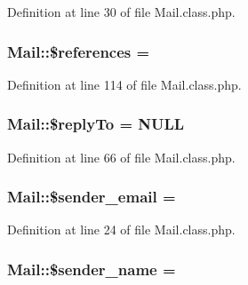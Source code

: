 Definition at line 30 of file Mail.\+class.\+php.

\subsubsection[{\texorpdfstring{\$references}{$references}}]{\setlength{\rightskip}{0pt plus 5cm}Mail\+::\$references = \textquotesingle{}\textquotesingle{}}\hypertarget{classMail_abcd438320caac44b166df90ba9092fe9}{}\label{classMail_abcd438320caac44b166df90ba9092fe9}


Definition at line 114 of file Mail.\+class.\+php.

\subsubsection[{\texorpdfstring{\$reply\+To}{$replyTo}}]{\setlength{\rightskip}{0pt plus 5cm}Mail\+::\$reply\+To = N\+U\+LL}\hypertarget{classMail_a55788852017ccc1716af69cdde26df99}{}\label{classMail_a55788852017ccc1716af69cdde26df99}


Definition at line 66 of file Mail.\+class.\+php.

\subsubsection[{\texorpdfstring{\$sender\+\_\+email}{$sender_email}}]{\setlength{\rightskip}{0pt plus 5cm}Mail\+::\$sender\+\_\+email = \textquotesingle{}\textquotesingle{}}\hypertarget{classMail_a94dccbbdc161e818d90e41ad197ebe85}{}\label{classMail_a94dccbbdc161e818d90e41ad197ebe85}


Definition at line 24 of file Mail.\+class.\+php.

\subsubsection[{\texorpdfstring{\$sender\+\_\+name}{$sender_name}}]{\setlength{\rightskip}{0pt plus 5cm}Mail\+::\$sender\+\_\+name = \textquotesingle{}\textquotesingle{}}\hypertarget{classMail_a0ad6aa18dc8ea8c632bb7a82175e8d68}{}\label{classMail_a0ad6aa18dc8ea8c632bb7a82175e8d68}


